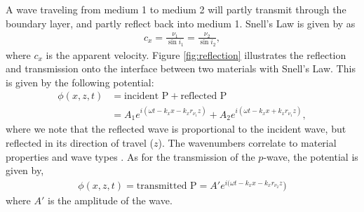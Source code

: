 A wave traveling from medium 1 to medium 2 will partly transmit through the boundary layer, and partly reflect back into medium 1. 
Snell's Law is given by \cite[67]{stein2009introduction} as
\begin{align}
    c_x = \frac{\nu_1}{\sin i_1} = \frac{\nu_2}{\sin i_2},
\end{align} where $c_x$ is the apparent velocity. Figure \ref{fig:reflection} illustrates the reflection and transmission onto the interface between two materials with Snell's Law. This is given by the following potential:
\begin{align}
    \phi(x,z,t)&=\textrm{incident P}+\textrm{reflected P}\\
    &=A_1e^{i(\omega t-k_xx-k_xr_{\nu_1}z)}
    +A_2e^{i(\omega t-k_xx+k_xr_{\nu_1}z)},
\end{align}
where we note that the reflected wave is proportional to the incident wave, but reflected in its direction of travel ($z$). The wavenumbers correlate to material properties and wave types \cite[66]{stein2009introduction}.
As for the transmission of the $p$-wave, the potential is given by,
\begin{align}
    \phi(x,z,t)=\textrm{transmitted P}=A'e^{i(\omega t-k_xx-k_xr_{\nu_2}z})
\end{align}
where $A'$ is the amplitude of the wave.


